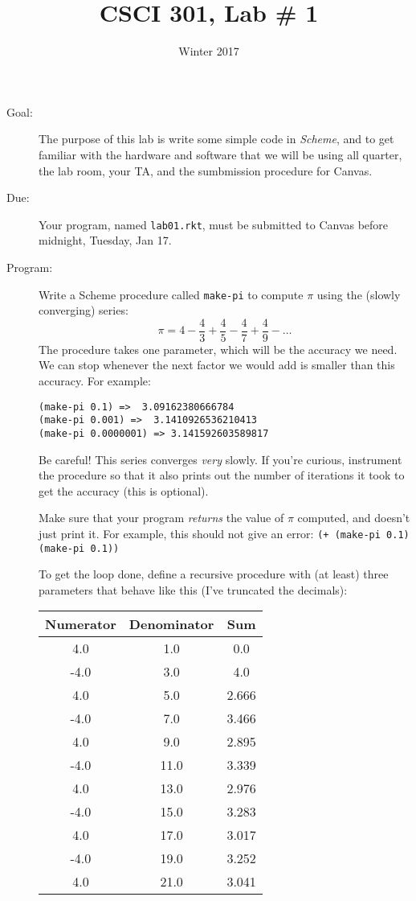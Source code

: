 \documentclass{article}
\title{CSCI 301, Lab \# 1}
\author{Winter 2017}
\date{}
\begin{document}
\maketitle
\begin{multicols}{2}

\begin{description}
\item[Goal:] The purpose of this lab is write some simple code in {\em
  Scheme}, and to get familiar with the hardware and software that we
  will be using all quarter, the lab room, your TA, and the
  sumbmission procedure for Canvas.

\item[Due:] Your program, named {\tt lab01.rkt}, must be submitted to
  Canvas before midnight, Tuesday, Jan 17.

\item[Program:] Write a {\sc Scheme} procedure called {\tt make-pi} 
to compute $\pi$
  using the (slowly converging) series:
\[
{\pi} = 4 - \frac43 + \frac45 - \frac47 + \frac49 - \ldots
\]
The procedure takes one parameter, which will be the 
accuracy we need.  We can stop whenever the next factor we would
add is smaller than this accuracy.  For example:
\begin{Verbatim}[frame=single]
(make-pi 0.1) =>  3.09162380666784
(make-pi 0.001) =>  3.1410926536210413
(make-pi 0.0000001) => 3.141592603589817
\end{Verbatim}
Be careful!  This series converges {\em very} slowly.  If you're
curious, instrument the procedure so that it also prints out the
number of iterations it took to get the accuracy (this is optional).

Make sure that your program {\em returns} the value of $\pi$ computed,
and doesn't just print it.  For example, this should not give an
error: \verb|(+ (make-pi 0.1) (make-pi 0.1))|


To get the loop done, define a recursive procedure with (at least)
three
parameters that behave like this (I've truncated the decimals):\\
\begin{tabular}{ccc}
 Numerator & Denominator & Sum \\\hline
 4.0 & 1.0 & 0.0\\
 -4.0 & 3.0 & 4.0\\
 4.0 & 5.0 & 2.666\\
 -4.0 & 7.0 & 3.466\\
 4.0 & 9.0 & 2.895\\
 -4.0 & 11.0 & 3.339\\
 4.0 & 13.0 & 2.976\\
 -4.0 & 15.0 & 3.283\\
 4.0 & 17.0 & 3.017\\
 -4.0 & 19.0 & 3.252\\
 4.0 & 21.0 & 3.041\\
\end{tabular}


\end{description}
\end{multicols}
\end{document}
